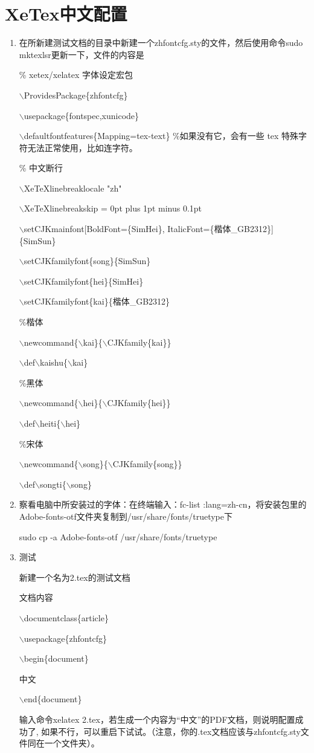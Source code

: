 \documentclass[12pt]{article}
\begin{document}
\section{XeTex中文配置}

\begin{enumerate}

\item 在所新建测试文档的目录中新建一个zhfontcfg.sty的文件，然后使用命令sudo mktexlsr更新一下，文件的内容是

\% xetex/xelatex 字体设定宏包

$\backslash$ProvidesPackage\{zhfontcfg\}

$\backslash$usepackage\{fontspec,xunicode\}

$\backslash$defaultfontfeatures\{Mapping=tex-text\} \%如果没有它，会有一些 tex 特殊字符无法正常使用，比如连字符。

\% 中文断行

$\backslash$XeTeXlinebreaklocale "zh"

$\backslash$XeTeXlinebreakskip = 0pt plus 1pt minus 0.1pt

$\backslash$setCJKmainfont[BoldFont=\{SimHei\}, ItalicFont=\{楷体\_GB2312\}]\{SimSun\}

$\backslash$setCJKfamilyfont\{song\}\{SimSun\}

$\backslash$setCJKfamilyfont\{hei\}\{SimHei\}

$\backslash$setCJKfamilyfont\{kai\}\{楷体\_GB2312\}
 

\%楷体

$\backslash$newcommand\{$\backslash$kai\}\{$\backslash$CJKfamily\{kai\}\} 

$\backslash$def$\backslash$kaishu\{$\backslash$kai\}

\%黑体

$\backslash$newcommand\{$\backslash$hei\}\{$\backslash$CJKfamily\{hei\}\} 

$\backslash$def$\backslash$heiti\{$\backslash$hei\}

\%宋体

$\backslash$newcommand\{$\backslash$song\}\{$\backslash$CJKfamily\{song\}\} 

$\backslash$def$\backslash$songti\{$\backslash$song\}

\item 察看电脑中所安装过的字体：在终端输入：fc-list :lang=zh-cn，将安装包里的Adobe-fonts-otf文件夹复制到/usr/share/fonts/truetype下

sudo cp -a Adobe-fonts-otf /usr/share/fonts/truetype

\item 测试

新建一个名为2.tex的测试文档

文档内容

$\backslash$documentclass\{article\}

$\backslash$usepackage\{zhfontcfg\}

$\backslash$begin\{document\}

中文

$\backslash$end\{document\}

输入命令xelatex 2.tex，若生成一个内容为“中文”的PDF文档，则说明配置成功了, 如果不行，可以重启下试试。（注意，你的.tex文档应该与zhfontcfg.sty文件同在一个文件夹）。

\end{enumerate}
\end{document}
